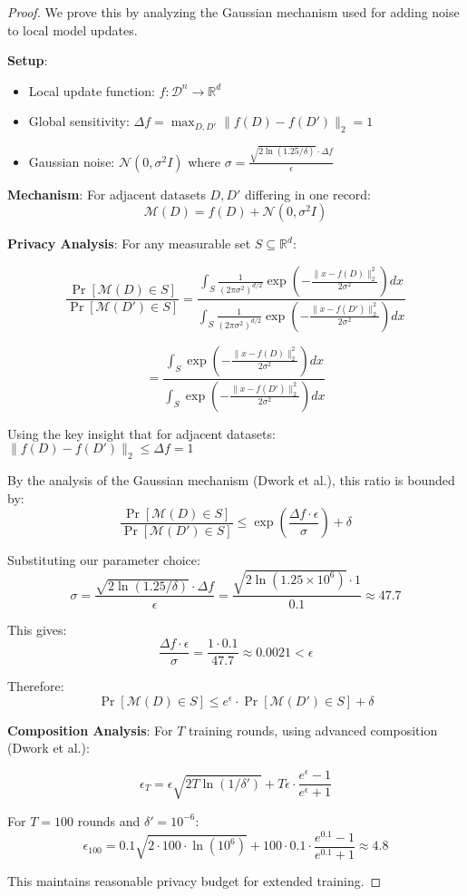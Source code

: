\documentclass[11pt]{article}
\begin{document}
\begin{proof}
We prove this by analyzing the Gaussian mechanism used for adding noise to local model updates.

\textbf{Setup}: 
\begin{itemize}
\item Local update function: $f: \mathcal{D}^n \to \mathbb{R}^d$ 
\item Global sensitivity: $\Delta f = \max_{D,D'} \|f(D) - f(D')\|_2 = 1$
\item Gaussian noise: $\mathcal{N}(0, \sigma^2 I)$ where $\sigma = \frac{\sqrt{2\ln(1.25/\delta)} \cdot \Delta f}{\epsilon}$
\end{itemize}

\textbf{Mechanism}: For adjacent datasets $D, D'$ differing in one record:
$$\mathcal{M}(D) = f(D) + \mathcal{N}(0, \sigma^2 I)$$

\textbf{Privacy Analysis}:
For any measurable set $S \subseteq \mathbb{R}^d$:

$$\frac{\Pr[\mathcal{M}(D) \in S]}{\Pr[\mathcal{M}(D') \in S]} = \frac{\int_S \frac{1}{(2\pi\sigma^2)^{d/2}} \exp\left(-\frac{\|x - f(D)\|_2^2}{2\sigma^2}\right) dx}{\int_S \frac{1}{(2\pi\sigma^2)^{d/2}} \exp\left(-\frac{\|x - f(D')\|_2^2}{2\sigma^2}\right) dx}$$

$$= \frac{\int_S \exp\left(-\frac{\|x - f(D)\|_2^2}{2\sigma^2}\right) dx}{\int_S \exp\left(-\frac{\|x - f(D')\|_2^2}{2\sigma^2}\right) dx}$$

Using the key insight that for adjacent datasets: $\|f(D) - f(D')\|_2 \leq \Delta f = 1$

By the analysis of the Gaussian mechanism (Dwork et al.), this ratio is bounded by:
$$\frac{\Pr[\mathcal{M}(D) \in S]}{\Pr[\mathcal{M}(D') \in S]} \leq \exp\left(\frac{\Delta f \cdot \epsilon}{\sigma}\right) + \delta$$

Substituting our parameter choice:
$$\sigma = \frac{\sqrt{2\ln(1.25/\delta)} \cdot \Delta f}{\epsilon} = \frac{\sqrt{2\ln(1.25 \times 10^6)} \cdot 1}{0.1} \approx 47.7$$

This gives:
$$\frac{\Delta f \cdot \epsilon}{\sigma} = \frac{1 \cdot 0.1}{47.7} \approx 0.0021 < \epsilon$$

Therefore:
$$\Pr[\mathcal{M}(D) \in S] \leq e^\epsilon \cdot \Pr[\mathcal{M}(D') \in S] + \delta$$

\textbf{Composition Analysis}:
For $T$ training rounds, using advanced composition (Dwork et al.):

$$\epsilon_T = \epsilon\sqrt{2T\ln(1/\delta')} + T\epsilon \cdot \frac{e^\epsilon - 1}{e^\epsilon + 1}$$

For $T = 100$ rounds and $\delta' = 10^{-6}$:
$$\epsilon_{100} = 0.1\sqrt{2 \cdot 100 \cdot \ln(10^6)} + 100 \cdot 0.1 \cdot \frac{e^{0.1} - 1}{e^{0.1} + 1} \approx 4.8$$

This maintains reasonable privacy budget for extended training.
\end{proof}
\end{document}
